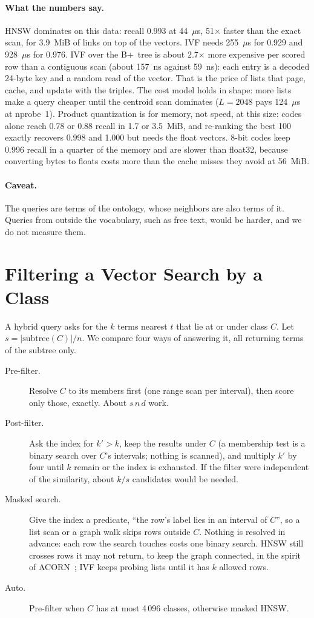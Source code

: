 \documentclass[sigconf, nonacm]{acmart}
\begin{document}
\paragraph{What the numbers say.} HNSW dominates on this data: recall 0.993 at 44~$\mu$s, 51$\times$ faster than the exact scan, for 3.9~MiB of links on top of the vectors. IVF needs 255~$\mu$s for 0.929 and 928~$\mu$s for 0.976. IVF over the B+~tree is about 2.7$\times$ more expensive per scored row than a contiguous scan (about 157~ns against 59~ns): each entry is a decoded 24-byte key and a random read of the vector. That is the price of lists that page, cache, and update with the triples. The cost model holds in shape: more lists make a query cheaper until the centroid scan dominates ($L{=}2048$ pays 124~$\mu$s at nprobe~1). Product quantization is for memory, not speed, at this size: codes alone reach 0.78 or 0.88 recall in 1.7 or 3.5~MiB, and re-ranking the best 100 exactly recovers 0.998 and 1.000 but needs the float vectors. 8-bit codes keep 0.996 recall in a quarter of the memory and are slower than float32, because converting bytes to floats costs more than the cache misses they avoid at 56~MiB.

\paragraph{Caveat.} The queries are terms of the ontology, whose neighbors are also terms of it. Queries from outside the vocabulary, such as free text, would be harder, and we do not measure them.


\section{Filtering a Vector Search by a Class}
\label{sec:hybrid}

A hybrid query asks for the $k$ terms nearest $t$ that lie at or under class $C$. Let $s=|\mathrm{subtree}(C)|/n$. We compare four ways of answering it, all returning terms of the subtree only.

\begin{description}
\item[Pre-filter.] Resolve $C$ to its members first (one range scan per interval), then score only those, exactly. About $s\,n\,d$ work.
\item[Post-filter.] Ask the index for $k'>k$, keep the results under $C$ (a membership test is a binary search over $C$'s intervals; nothing is scanned), and multiply $k'$ by four until $k$ remain or the index is exhausted. If the filter were independent of the similarity, about $k/s$ candidates would be needed.
\item[Masked search.] Give the index a predicate, ``the row's label lies in an interval of $C$'', so a list scan or a graph walk skips rows outside $C$. Nothing is resolved in advance: each row the search touches costs one binary search. HNSW still crosses rows it may not return, to keep the graph connected, in the spirit of ACORN~\cite{patel2024}; IVF keeps probing lists until it has $k$ allowed rows.
\item[Auto.] Pre-filter when $C$ has at most 4\,096 classes, otherwise masked HNSW.
\end{description}
\end{document}
